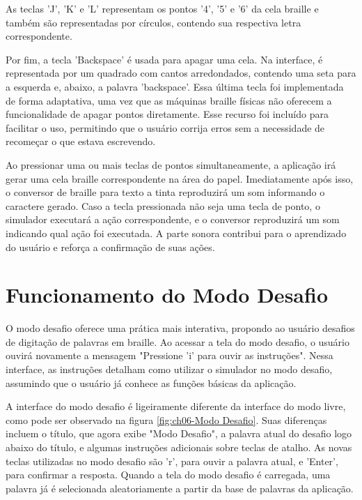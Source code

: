 As teclas 'J', 'K' e 'L' representam os pontos '4', '5' e '6' da cela braille e também são representadas por círculos, contendo sua respectiva letra correspondente. 

Por fim, a tecla 'Backspace' é usada para apagar uma cela. Na interface, é representada por um quadrado com cantos arredondados, contendo uma seta para a esquerda e, abaixo, a palavra 'backspace'. Essa última tecla foi implementada de forma adaptativa, uma vez que as máquinas braille físicas não oferecem a funcionalidade de apagar pontos diretamente. Esse recurso foi incluído para facilitar o uso, permitindo que o usuário corrija erros sem a necessidade de recomeçar o que estava escrevendo.

Ao pressionar uma ou mais teclas de pontos simultaneamente, a aplicação irá gerar uma cela braille correspondente na área do papel. Imediatamente após isso, o conversor de braille para texto a tinta reproduzirá um som informando o caractere gerado. Caso a tecla pressionada não seja uma tecla de ponto, o simulador executará a ação correspondente, e o conversor reproduzirá um som indicando qual ação foi executada. A parte sonora contribui para o aprendizado do usuário e reforça a confirmação de suas ações.

\section{Funcionamento do Modo Desafio}

O modo desafio oferece uma prática mais interativa, propondo ao usuário desafios de digitação de palavras em braille. Ao acessar a tela do modo desafio, o usuário ouvirá novamente a mensagem "Pressione 'i' para ouvir as instruções". Nessa interface, as instruções detalham como utilizar o simulador no modo desafio, assumindo que o usuário já conhece as funções básicas da aplicação.

A interface do modo desafio é ligeiramente diferente da interface do modo livre, como pode ser observado na figura \ref{fig:ch06-Modo Desafio}. Suas diferenças incluem o título, que agora exibe "Modo Desafio", a palavra atual do desafio logo abaixo do título, e algumas instruções adicionais sobre teclas de atalho. As novas teclas utilizadas no modo desafio são 'r', para ouvir a palavra atual, e 'Enter', para confirmar a resposta. Quando a tela do modo desafio é carregada, uma palavra já é selecionada aleatoriamente a partir da base de palavras da aplicação.

